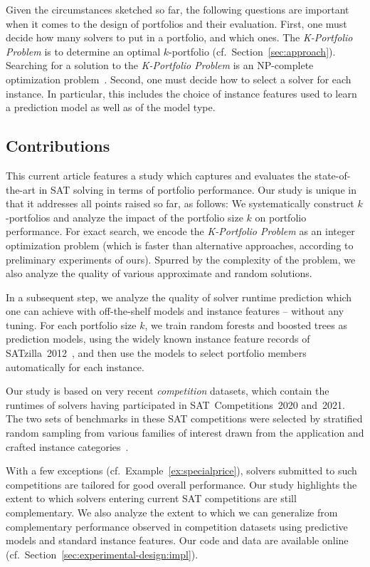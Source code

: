 \documentclass[a4paper,USenglish,pdfa]{lipics-v2021} %
\begin{document}
Given the circumstances sketched so far, the following questions are important when it comes to the design of portfolios and their evaluation. 
First, one must decide how many solvers to put in a portfolio, and which ones. 
The \emph{K-Portfolio Problem} is to determine an optimal $k$-portfolio (cf.\ Section~\ref{sec:approach}). 
Searching for a solution to the \emph{K-Portfolio Problem} is an NP-complete optimization problem~\cite{nof2020real}. 
Second, one must decide how to select a solver for each instance. 
In particular, this includes the choice of instance features used to learn a prediction model as well as of the model type. 

\subsection{Contributions}

This current article features a study which captures and evaluates the state-of-the-art in SAT solving in terms of portfolio performance. 
Our study is unique in that it addresses all points raised so far, as follows:
We systematically construct $k$-portfolios and analyze the impact of the portfolio size $k$ on portfolio performance. 
For exact search, we encode the \emph{K-Portfolio Problem} as an integer optimization problem (which is faster than alternative approaches, according to preliminary experiments of ours). 
Spurred by the complexity of the problem, we also analyze the quality of various approximate and random solutions. 

In a subsequent step, we analyze the quality of solver runtime prediction which one can achieve with off-the-shelf models and instance features -- without any tuning.
For each portfolio size $k$, we train random forests and boosted trees as prediction models, using the widely known instance feature records of SATzilla~2012~\cite{xu2012satzilla2012}, and then use the models to select portfolio members automatically for each instance. 

Our study is based on very recent \emph{competition} datasets, which contain the runtimes of solvers having participated in SAT~Competitions~2020 and~2021. 
The two sets of benchmarks in these SAT competitions were selected by stratified random sampling from various families of interest drawn from the application and crafted instance categories~\cite{SC2020:AIJ}.

With a few exceptions (cf.~Example~\ref{ex:specialprice}), solvers submitted to such competitions are tailored for good overall performance.
Our study highlights the extent to which solvers entering current SAT competitions are still complementary.
We also analyze the extent to which we can generalize from complementary performance observed in competition datasets using predictive models and standard instance features.
Our code and data are available online (cf.~Section~\ref{sec:experimental-design:impl}).
\end{document}
